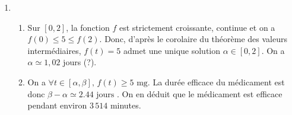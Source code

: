 \documentclass[a4paper]{report}
\begin{document}
\begin{enumerate}
\begin{enumerate}
					Comme dit précédemment,  $\forall u \in \R, \,e^{u} > 0$. Donc, le signe de $f'$ est celui de $t \mapsto 3 - \frac{3}{2}t$.
					\[
						f'(t) > 0 \iff 3 - \frac{3}{2}t > 0 \iff t > 2
					.\]
					On calcule les valeurs de $f$ pour 0, 2 et 10 : \[
						\begin{cases}
							f(0) = 0\\
							f(2) = 6\\
							f(10) = \frac{30}{e^4}
						\end{cases}
					.\]
					D'où,
					\begin{center}
					\end{center}
				\item Selon cette modélisation, la quantité de médicament est maximale au bout de 2 jours : le patient présente 5 mg de médicament dans le sang.
			\end{enumerate}
		\item
			\begin{enumerate}
				\item Sur $[0,2]$, la fonction $f$ est strictement croissante, continue et on a $f(0) \le 5 \le f(2)$. Donc, d'après le corolaire du théorème des valeurs intermédiaires, $f(t) = 5$ admet une unique solution $\alpha \in [0,2]$. On a $\alpha \simeq 1,\!02$ jours (?).
				\item On a $\forall t \in [\alpha, \beta],\,f(t) \ge 5 \text{ mg}$. La durée efficace du médicament est donc $\beta - \alpha \simeq 2.44 \text{ jours }$. On en déduit que le médicament est efficace pendant environ $3\,514$ minutes.
			\end{enumerate}
	\end{enumerate}
\end{document}
